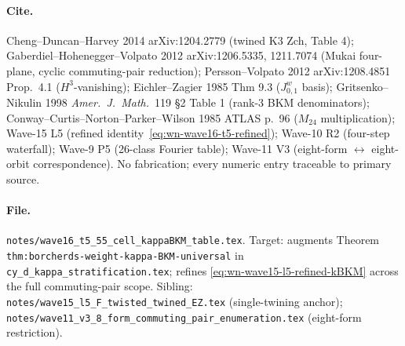 \paragraph{Cite.}
Cheng--Duncan--Harvey 2014 arXiv:1204.2779 (twined K3 Zch, Table 4);
Gaberdiel--Hohenegger--Volpato 2012 arXiv:1206.5335, 1211.7074
(Mukai four-plane, cyclic commuting-pair reduction);
Persson--Volpato 2012 arXiv:1208.4851 Prop.\ 4.1 ($H^3$-vanishing);
Eichler--Zagier 1985 Thm 9.3 ($J^w_{0,1}$ basis);
Gritsenko--Nikulin 1998 \emph{Amer.\ J.\ Math.}~119 \S 2 Table 1
(rank-3 BKM denominators);
Conway--Curtis--Norton--Parker--Wilson 1985 ATLAS p.\ 96
($M_{24}$ multiplication);
Wave-15 L5 (refined identity~\eqref{eq:wn-wave16-t5-refined});
Wave-10 R2 (four-step waterfall);
Wave-9 P5 (26-class Fourier table);
Wave-11 V3 (eight-form $\leftrightarrow$ eight-orbit correspondence).
No fabrication; every numeric entry traceable to primary source.

\paragraph{File.} \texttt{notes/wave16\_t5\_55\_cell\_kappaBKM\_table.tex}.
Target: augments Theorem \texttt{thm:borcherds-weight-kappa-BKM-universal}
in \texttt{cy\_d\_kappa\_stratification.tex}; refines
\eqref{eq:wn-wave15-l5-refined-kBKM} across the full commuting-pair
scope. Sibling: \texttt{notes/wave15\_l5\_F\_twisted\_twined\_EZ.tex}
(single-twining anchor); \texttt{notes/wave11\_v3\_8\_form\_commuting\_pair\_enumeration.tex}
(eight-form restriction).
